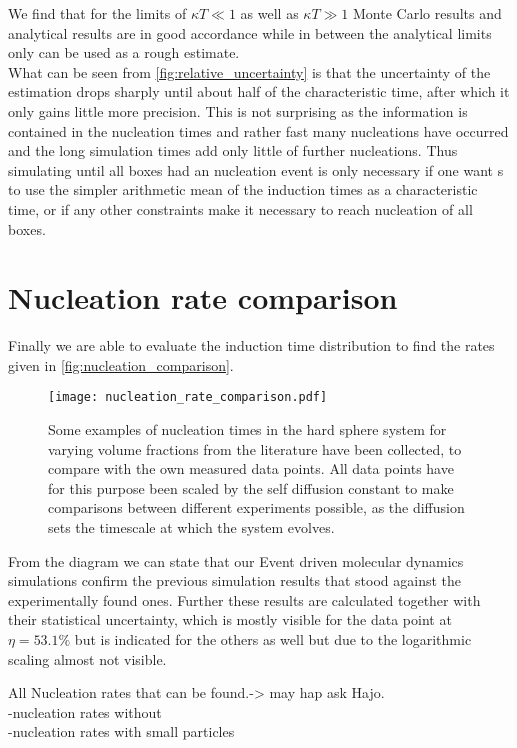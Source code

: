We find that for the limits of $\kappa T \ll 1$ as well as $\kappa T \gg 1$ Monte Carlo results and analytical results are in good accordance while in between the analytical limits only can be used as a rough estimate.\\

What can be seen from \autoref{fig:relative_uncertainty} is that the uncertainty of the estimation drops sharply until about half of the characteristic time, after which it only gains little more precision. This is not surprising as the information is contained in the nucleation times and rather fast many nucleations have occurred and the long simulation times add only little of further nucleations. Thus simulating until all boxes had an nucleation event is only necessary if one want s to use the simpler arithmetic mean of the induction times as a characteristic time, or if any other constraints make it necessary to reach nucleation of all boxes.

\section{Nucleation rate comparison}
\label{sec:nucleation_rates}
Finally we are able to evaluate the induction time distribution to find the rates given in \autoref{fig:nucleation_comparison}.

\begin{figure}[h!]
\centering
\texttt{[image: nucleation\_rate\_comparison.pdf]}
\caption[Nucleation rate comparison with literature values]{Some examples of nucleation times in the hard sphere system for varying volume fractions from the literature have been collected, to compare with the own measured data points. All data points have for this purpose been scaled by the self diffusion constant to make comparisons between different experiments possible, as the diffusion sets the timescale at which the system evolves.}
\label{fig:nucleation_comparison}
\end{figure}

From the diagram we can state that our Event driven molecular dynamics simulations confirm the previous simulation results that stood against the experimentally found ones. Further these results are calculated together with their statistical uncertainty, which is mostly visible for the data point at $\eta = 53.1 \%$ but is indicated for the others as well but due to the logarithmic scaling almost not visible.

All Nucleation rates that can be found.-> may hap ask Hajo.\\
-nucleation rates without\\
-nucleation rates with small particles\\


